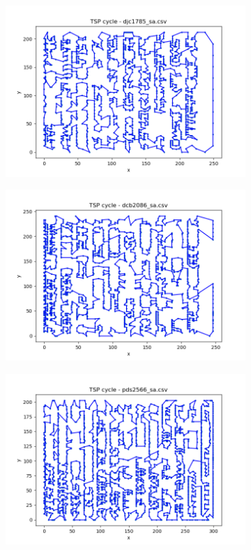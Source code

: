 \documentclass[12pt]{article}
\begin{document}
\begin{figure}[htpb]
\begin{subfigure}[b]{0.475\textwidth}
                \includegraphics[width=\linewidth]{img/djc1785_sa.png}
            \end{subfigure}
            \hfill
            \begin{subfigure}[b]{0.475\textwidth}
                \includegraphics[width=\linewidth]{img/dcb2086_sa.png}
            \end{subfigure}
            \begin{subfigure}[b]{0.475\textwidth}
                \includegraphics[width=\linewidth]{img/pds2566_sa.png}

\end{subfigure}
\end{figure}
\end{document}
